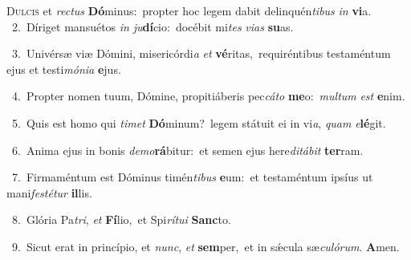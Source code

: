 \lettrine{\initial\textcolor{\initialcolor}{D}}{ulcis} et \textit{rec}\-\textit{tus} \textbf{Dó}\-minus:~\star propter hoc legem dabit delinquén\-\textit{ti}\-\textit{bus} \textit{in} \textbf{vi}\-a.\\
{\numbfont\textcolor{\numbcolor}{~2.}}~Díriget mansuétos \textit{in} \textit{ju}\-\textbf{dí}cio:~\star docébit mi\textit{tes} \textit{vi}\-\textit{as} \textbf{su}\-as.\par
{\numbfont\textcolor{\numbcolor}{~3.}}~Univérsæ viæ Dómini, misericórdi\textit{a} \textit{et} \textbf{vé}\-ritas,~\star requiréntibus testaméntum ejus et testi\-\textit{mó}\-\textit{ni}\textit{a} \textbf{e}\-jus.\par
{\numbfont\textcolor{\numbcolor}{~4.}}~Propter nomen tuum, Dómine, propitiáberis pec\-\textit{cá}\-\textit{to} \textbf{me}\-o:~\star \textit{mul}\-\textit{tum} \textit{est} \textbf{e}\-nim.\par
{\numbfont\textcolor{\numbcolor}{~5.}}~Quis est homo qui \textit{ti}\-\textit{met} \textbf{Dó}\-minum?~\star legem státuit ei in vi\-\textit{a}\-, \textit{quam} \textit{e}\-\textbf{lé}git.\par
{\numbfont\textcolor{\numbcolor}{~6.}}~Anima ejus in bonis \textit{de}\-\textit{mo}\textbf{rá}bitur:~\star et semen ejus here\-\textit{di}\-\textit{tá}\textit{bit} \textbf{ter}\-ram.\par
{\numbfont\textcolor{\numbcolor}{~7.}}~Firmaméntum est Dóminus timén\-\textit{ti}\-\textit{bus} \textbf{e}\-um:~\star et testaméntum ipsíus ut mani\-\textit{fes}\-\textit{té}\textit{tur} \textbf{il}\-lis.\par
{\numbfont\textcolor{\numbcolor}{~8.}}~Glória Pa\-\textit{tri}\-, \textit{et} \textbf{Fí}\-lio,~\star et Spi\-\textit{rí}\-\textit{tu}\textit{i} \textbf{Sanc}\-to.\par
{\numbfont\textcolor{\numbcolor}{~9.}}~Sicut erat in princípio, et \textit{nunc}\-, \textit{et} \textbf{sem}\-per,~\star et in sǽcula sæ\-\textit{cu}\-\textit{ló}\textit{rum}. \textbf{A}\-men.\par
